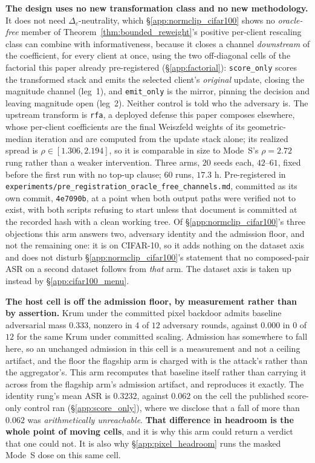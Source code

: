 \documentclass{article}
\begin{document}
\textbf{The design uses no new transformation class and no new methodology.} It does not need $\Delta_c$-neutrality, which §\ref{app:normclip_cifar100} shows no \emph{oracle-free} member of Theorem~\ref{thm:bounded_reweight}'s positive per-client rescaling class can combine with informativeness, because it closes a channel \emph{downstream} of the coefficient, for every client at once, using the two off-diagonal cells of the factorial this paper already pre-registered (§\ref{app:factorial}): \texttt{score\_only} scores the transformed stack and emits the selected client's \emph{original} update, closing the magnitude channel (leg~1), and \texttt{emit\_only} is the mirror, pinning the decision and leaving magnitude open (leg~2). Neither control is told who the adversary is. The upstream transform is \texttt{rfa}, a deployed defense this paper composes elsewhere, whose per-client coefficients are the final Weiszfeld weights of its geometric-median iteration and are computed from the update stack alone; its realized spread is $\rho \in [1.306, 2.194]$, so it is comparable in size to Mode~S's $\rho{=}2.72$ rung rather than a weaker intervention. Three arms, $20$ seeds each, $42$--$61$, fixed before the first run with no top-up clause; $60$ runs, $17.3$ h. Pre-registered in \texttt{experiments/\allowbreak pre\_registration\_\allowbreak oracle\_free\_\allowbreak channels.md}, committed as its own commit, \texttt{4e7090b}, at a point when both output paths were verified not to exist, with both scripts refusing to start unless that document is committed at the recorded hash with a clean working tree. Of §\ref{app:normclip_cifar100}'s three objections this arm answers two, adversary identity and the admission floor, and not the remaining one: it is on CIFAR-10, so it adds nothing on the dataset axis and does not disturb §\ref{app:normclip_cifar100}'s statement that no composed-pair ASR on a second dataset follows from \emph{that} arm. The dataset axis is taken up instead by §\ref{app:cifar100_menu}.

\textbf{The host cell is off the admission floor, by measurement rather than by assertion.} Krum under the committed pixel backdoor admits baseline adversarial mass $0.333$, nonzero in $4$ of $12$ adversary rounds, against $0.000$ in $0$ of $12$ for the same Krum under committed scaling. Admission has somewhere to fall here, so an unchanged admission in this cell is a measurement and not a ceiling artifact, and the floor the flagship arm is charged with is the attack's rather than the aggregator's. This arm recomputes that baseline itself rather than carrying it across from the flagship arm's admission artifact, and reproduces it exactly. The identity rung's mean ASR is $0.3232$, against $0.062$ on the cell the published score-only control ran (§\ref{app:score_only}), where we disclose that a fall of more than $0.062$ was \emph{arithmetically unreachable}. \textbf{That difference in headroom is the whole point of moving cells}, and it is why this arm could return a verdict that one could not. It is also why §\ref{app:pixel_headroom} runs the masked Mode~S dose on this same cell.
\end{document}
